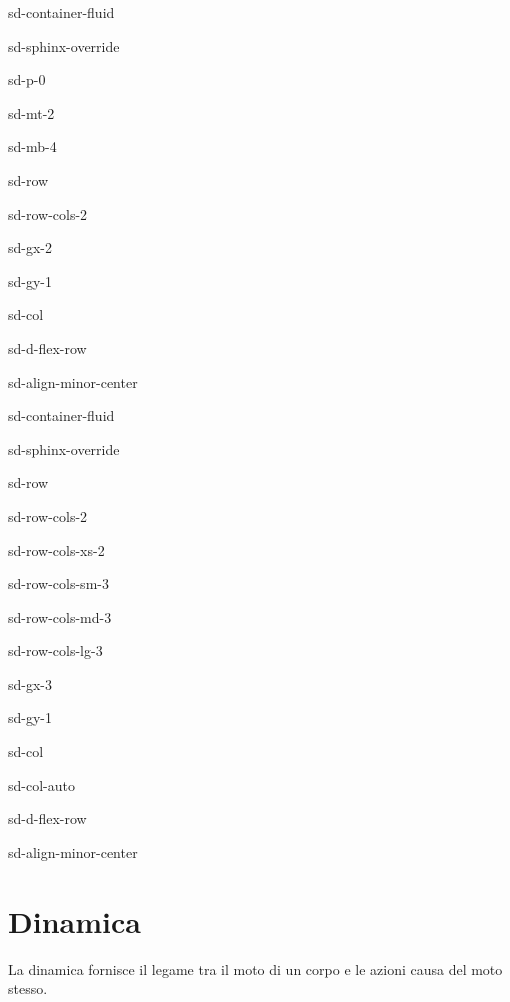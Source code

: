 \documentclass[letterpaper,10pt,english]{jupyterBook}
\begin{document}
\begin{sphinxuseclass}{sd-container-fluid}
\begin{sphinxuseclass}{sd-sphinx-override}
\begin{sphinxuseclass}{sd-p-0}
\begin{sphinxuseclass}{sd-mt-2}
\begin{sphinxuseclass}{sd-mb-4}
\begin{sphinxuseclass}{sd-row}
\begin{sphinxuseclass}{sd-row-cols-2}
\begin{sphinxuseclass}{sd-gx-2}
\begin{sphinxuseclass}{sd-gy-1}
\begin{sphinxuseclass}{sd-col}
\begin{sphinxuseclass}{sd-d-flex-row}
\begin{sphinxuseclass}{sd-align-minor-center}
\begin{sphinxuseclass}{sd-container-fluid}
\begin{sphinxuseclass}{sd-sphinx-override}
\begin{sphinxuseclass}{sd-row}
\begin{sphinxuseclass}{sd-row-cols-2}
\begin{sphinxuseclass}{sd-row-cols-xs-2}
\begin{sphinxuseclass}{sd-row-cols-sm-3}
\begin{sphinxuseclass}{sd-row-cols-md-3}
\begin{sphinxuseclass}{sd-row-cols-lg-3}
\begin{sphinxuseclass}{sd-gx-3}
\begin{sphinxuseclass}{sd-gy-1}
\begin{sphinxuseclass}{sd-col}
\begin{sphinxuseclass}{sd-col-auto}
\begin{sphinxuseclass}{sd-d-flex-row}
\begin{sphinxuseclass}{sd-align-minor-center}
\end{sphinxuseclass}
\end{sphinxuseclass}
\end{sphinxuseclass}
\end{sphinxuseclass}
\end{sphinxuseclass}
\end{sphinxuseclass}
\end{sphinxuseclass}
\end{sphinxuseclass}
\end{sphinxuseclass}
\end{sphinxuseclass}
\end{sphinxuseclass}
\end{sphinxuseclass}
\end{sphinxuseclass}
\end{sphinxuseclass}
\end{sphinxuseclass}
\end{sphinxuseclass}
\end{sphinxuseclass}
\end{sphinxuseclass}
\end{sphinxuseclass}
\end{sphinxuseclass}
\end{sphinxuseclass}
\end{sphinxuseclass}
\end{sphinxuseclass}
\end{sphinxuseclass}
\end{sphinxuseclass}
\end{sphinxuseclass}

\chapter{Dinamica}
\label{\detokenize{ch/dynamics:dinamica}}\label{\detokenize{ch/dynamics:classical-mechanics-dynamics}}\label{\detokenize{ch/dynamics::doc}}
\sphinxAtStartPar
La dinamica fornisce il legame tra il moto di un corpo e le azioni causa del moto stesso.
\end{document}
